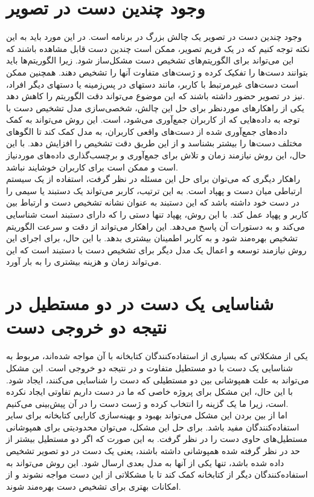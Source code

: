 \section{وجود چندین دست در تصویر}
وجود چندین دست در تصویر یک چالش بزرگ در برنامه است. در این مورد باید به این نکته توجه کنیم که در یک فریم تصویر، ممکن است چندین دست قابل مشاهده باشند که این می‌تواند برای الگوریتم‌های تشخیص دست مشکل‌ساز شود. زیرا 
الگوریتم‌ها باید بتوانند دست‌ها را تفکیک کرده و ژست‌های متفاوت آنها را تشخیص دهند. همچنین ممکن است دست‌های غیرمرتبط با کاربر، مانند دستهای در پس‌زمینه یا دستهای دیگر افراد، نیز در تصویر حضور داشته باشند که این موضوع می‌تواند دقت الگوریتم را کاهش دهد.
\\
یکی از راهکارهای موردنظر برای حل این چالش، شخصی‌سازی مدل تشخیص دست با توجه به داده‌هایی که از کاربران جمع‌آوری می‌شود، است. این روش می‌تواند به کمک داده‌های جمع‌آوری شده از دست‌های واقعی کاربران، به مدل کمک 
کند تا الگوهای مختلف دست‌ها را بیشتر بشناسد و از این طریق دقت تشخیص را افزایش دهد. با این حال، این روش نیازمند زمان و تلاش برای جمع‌آوری و برچسب‌گذاری داده‌های موردنیاز است و ممکن است برای کاربران خوشایند نباشد.
\\
راهکار دیگری که می‌توان برای حل این مسئله در نظر گرفت، استفاده از یک سیستم ارتباطی میان دست و پهپاد است. به این ترتیب، کاربر می‌تواند یک دستبند یا سیمی را در دست خود داشته باشد که این دستبند به عنوان نشانه تشخیص دست و 
ارتباط بین کاربر و پهپاد عمل کند. با این روش، پهپاد تنها دستی را که دارای دستبند است شناسایی می‌کند و به دستورات آن پاسخ می‌دهد. این راهکار می‌تواند از دقت و سرعت الگوریتم تشخیص بهره‌مند شود و به کاربر اطمینان بیشتری بدهد. با 
این حال، برای اجرای این روش نیازمند توسعه و اعمال یک مدل دیگر برای تشخیص دست با دستبند است که این می‌تواند زمان و هزینه بیشتری را به بار آورد.


\section{شناسایی یک دست در دو مستطیل در نتیجه دو خروجی دست}
یکی از مشکلاتی که بسیاری از استفاده‌کنندگان کتابخانه  با آن مواجه شده‌اند، مربوط به شناسایی یک دست با دو مستطیل متفاوت و در نتیجه دو خروجی است. این مشکل می‌تواند به علت همپوشانی بین دو مستطیلی که دست را 
شناسایی می‌کنند، ایجاد شود. با این حال، این مشکل برای پروژه خاصی که ما در دست داریم تفاوتی ایجاد نکرده است، زیرا ما یک گزینه را انتخاب کرده و ژست دست را در آن پیش‌بینی می‌کنیم.
\\
اما از بین بردن این مشکل می‌تواند بهبود و بهینه‌سازی کارایی کتابخانه برای سایر استفاده‌کنندگان مفید باشد. برای حل این مشکل، می‌توان محدودیتی برای همپوشانی مستطیل‌های حاوی دست را در نظر گرفت. به این صورت که اگر دو مستطیل بیشتر از حد در نظر گرفته شده 
همپوشانی داشته باشند، یعنی یک دست در دو تصویر تشخیص داده شده باشد، تنها یکی از آنها به مدل بعدی ارسال شود. این روش می‌تواند به استفاده‌کنندگان دیگر از کتابخانه  کمک کند تا با مشکلاتی از این دست مواجه نشوند و از امکانات بهتری برای تشخیص دست بهره‌مند شوند.

